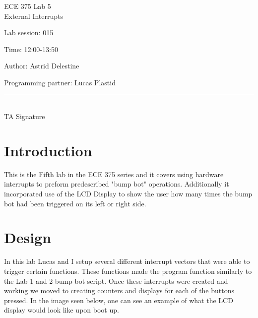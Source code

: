 \documentclass[12pt,letterpaper]{article}
\begin{document}
\begin{titlepage}
    \vspace*{4cm}
    \begin{flushright}
    {\huge
        ECE 375 Lab 5\\[1cm]
    }
    {\large
    	External Interrupts
    }
    \end{flushright}
    \begin{flushleft}
    Lab session: 015
    
    Time: 12:00-13:50
    \end{flushleft}
    \begin{flushright}
    Author: Astrid Delestine

    Programming partner: Lucas Plastid 

    \vfill
    \rule{5in}{.5mm}\\
    TA Signature
    \end{flushright}

\end{titlepage}

\section{Introduction}
This is the Fifth lab in the ECE 375 series and it covers using hardware interrupts to preform predescribed "bump bot" operations. Additionally it incorporated use of the LCD Display to show the user how many times the bump bot had been triggered on its left or right side.

\section{Design}
In this lab Lucas and I setup several different interrupt vectors that were able to trigger certain functions. These functions made the program function similarly to the Lab 1 and 2 bump bot script. Once these interrupts were created and working we moved to creating counters and displays for each of the buttons pressed. In the image seen below, one can see an example of what the LCD display would look like upon boot up. 
\end{document}
